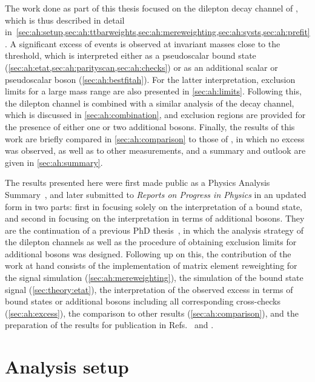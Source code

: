 The work done as part of this thesis focused on the dilepton decay channel of \ttbar, which is thus described in detail in~\cref{sec:ah:setup,sec:ah:ttbarweights,sec:ah:mereweighting,sec:ah:systs,sec:ah:prefit}. A significant excess of events is observed at invariant masses close to the \ttbar threshold, which is interpreted either as a pseudoscalar \ttbar bound state (\cref{sec:ah:etat,sec:ah:parityscan,sec:ah:checks}) or as an additional scalar or pseudoscalar boson (\cref{sec:ah:bestfitah}). For the latter interpretation, exclusion limits for a large mass range are also presented in \cref{sec:ah:limits}. Following this, the dilepton channel is combined with a similar analysis of the \ljets decay channel, which is discussed in \cref{sec:ah:combination}, and exclusion regions are provided for the presence of either one or two additional bosons. Finally, the results of this work are briefly compared in \cref{sec:ah:comparison} to those of , in which no excess was observed, as well as to other \ttbar measurements, and a summary and outlook are given in \cref{sec:ah:summary}.

The results presented here were first made public as a Physics Analysis Summary~\cite{CMS:HIG-22-013-PAS}, and later submitted to \textit{Reports on Progress in Physics} in an updated form in two parts: first in  focusing solely on the interpretation of a \ttbar bound state, and second in  focusing on the interpretation in terms of additional bosons. They are the continuation of a previous PhD thesis~\cite{Rubenach:PhD}, in which the analysis strategy of the dilepton channels as well as the procedure of obtaining exclusion limits for additional bosons was designed. Following up on this, the contribution of the work at hand consists of the implementation of matrix element reweighting for the signal simulation (\cref{sec:ah:mereweighting}), the simulation of the \ttbar bound state signal (\cref{sec:theory:etat}), the interpretation of the observed excess in terms of \ttbar bound states or additional bosons including all corresponding cross-checks (\cref{sec:ah:excess}), the comparison to other results (\cref{sec:ah:comparison}), and the preparation of the results for publication in Refs.~\cite{CMS:HIG-22-013} and \cite{CMS:TOP-24-007}.

\section{Analysis setup}
\label{sec:ah:setup}


